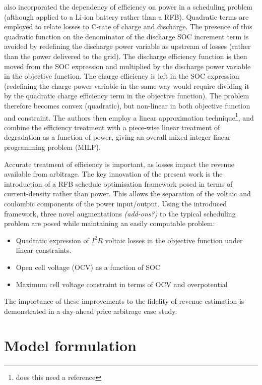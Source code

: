 \documentclass[preprint,3p,review,authoryear,10pt]{elsarticle}
\newcommand{\sol}[1]{\footnote{#1}\marginpar{\fbox{\thefootnote}}}
\begin{document}
\cite{Sarker2017} also incorporated the dependency of efficiency on power in a scheduling problem (although applied to a Li-ion battery rather than a RFB). Quadratic terms are employed to relate losses to C-rate of charge and discharge. The presence of this quadratic function on the denominator of the discharge SOC increment term is avoided by redefining the discharge power variable as upstream of losses (rather than the power delivered to the grid). The discharge efficiency function is then moved from the SOC expression and multiplied by the discharge power variable in the objective function. The charge efficiency is left in the SOC expression (redefining the charge power variable in the same way would require dividing it by the quadratic charge efficiency term in the objective function). The problem therefore becomes convex (quadratic), but non-linear in both objective function and constraint. The authors then employ a linear approximation technique\sol{does this need a reference}, and combine the efficiency treatment with a piece-wise linear treatment of degradation as a function of power, giving an overall mixed integer-linear programming problem (MILP). 

Accurate treatment of efficiency is important, as losses impact the revenue available from arbitrage. The key innovation of the present work is the introduction of a RFB schedule optimisation framework posed in terms of current-density rather than power. This allows the separation of the voltaic and coulombic components of the power input/output. Using the introduced framework, three novel augmentations \emph{(add-ons?)} to the typical scheduling problem are posed while maintaining an easily computable problem:

\begin{itemize}
    \item Quadratic expression of $I^2R$ voltaic losses in the objective function under linear constraints.
    \item Open cell voltage (OCV) as a function of SOC
    \item Maximum cell voltage constraint in terms of OCV and overpotential
\end{itemize}

The importance of these improvements to the fidelity of revenue estimation is demonstrated in a day-ahead price arbitrage case study. 


\section{Model formulation}
\label{sec:Model_Formulation}
\end{document}
